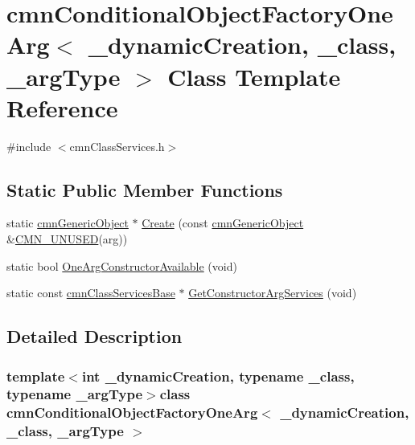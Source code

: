 \hypertarget{classcmn_conditional_object_factory_one_arg}{}\section{cmn\+Conditional\+Object\+Factory\+One\+Arg$<$ \+\_\+dynamic\+Creation, \+\_\+class, \+\_\+arg\+Type $>$ Class Template Reference}
\label{classcmn_conditional_object_factory_one_arg}


{\ttfamily \#include $<$cmn\+Class\+Services.\+h$>$}

\subsection*{Static Public Member Functions}
\begin{DoxyCompactItemize}
\item 
static \hyperlink{classcmn_generic_object}{cmn\+Generic\+Object} $\ast$ \hyperlink{classcmn_conditional_object_factory_one_arg_a3a5d1e07df67f33f80f47328ae3b956b}{Create} (const \hyperlink{classcmn_generic_object}{cmn\+Generic\+Object} \&\hyperlink{cmn_portability_8h_a021894e2626935fa2305434b1e893ff6}{C\+M\+N\+\_\+\+U\+N\+U\+S\+E\+D}(arg))
\item 
static bool \hyperlink{classcmn_conditional_object_factory_one_arg_a19c7018c0c501a3efb544ffea93944f5}{One\+Arg\+Constructor\+Available} (void)
\item 
static const \hyperlink{classcmn_class_services_base}{cmn\+Class\+Services\+Base} $\ast$ \hyperlink{classcmn_conditional_object_factory_one_arg_acd821221491f8271382e818f6d98dba5}{Get\+Constructor\+Arg\+Services} (void)
\end{DoxyCompactItemize}


\subsection{Detailed Description}
\subsubsection*{template$<$int \+\_\+dynamic\+Creation, typename \+\_\+class, typename \+\_\+arg\+Type$>$class cmn\+Conditional\+Object\+Factory\+One\+Arg$<$ \+\_\+dynamic\+Creation, \+\_\+class, \+\_\+arg\+Type $>$}

